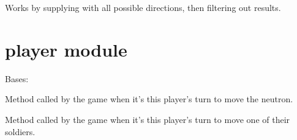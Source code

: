 \documentclass[letterpaper,10pt,english,openany,oneside]{sphinxmanual}
\begin{document}
\begin{fulllineitems}
\begin{fulllineitems}
Works by supplying {\hyperref[\detokenize{neutron:neutron.NeutronBoard.furthest_empty_spot}]{}} with all
possible directions, then filtering out  results.

\end{fulllineitems}


\end{fulllineitems}



\section{player module}
\label{\detokenize{player:module-player}}\label{\detokenize{player:player-module}}\label{\detokenize{player::doc}}

\begin{fulllineitems}
\label{\detokenize{player:player.HumanPlayer}}
Bases: {\hyperref[\detokenize{player:player.Player}]{}}

\begin{fulllineitems}
\label{\detokenize{player:player.HumanPlayer.move_neutron}}
Method called by the game when it’s this player’s turn to move the
neutron.

\end{fulllineitems}


\begin{fulllineitems}
\label{\detokenize{player:player.HumanPlayer.move_soldier}}
Method called by the game when it’s this player’s turn to move one of
their soldiers.

\end{fulllineitems}


\end{fulllineitems}
\end{document}
